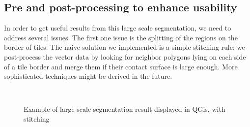 \documentclass{josis}
\begin{document}
\subsection{Pre and post-processing to enhance usability}

In order to get useful results from this large scale segmentation, we
need to address several issues. The first one issue is the splitting
of the regions on the border of tiles. The naive solution we
implemented is a simple stitching rule: we post-process the vector
data by looking for neighbor polygons lying on each side of a tile
border and merge them if their contact surface is large enough. More
sophisticated techniques might be derived in the future.

\begin{figure}[!htb]
\centering
{}\\
\caption{Example of large scale segmentation result displayed in QGis, with stitching}
\end{figure}
\end{document}
